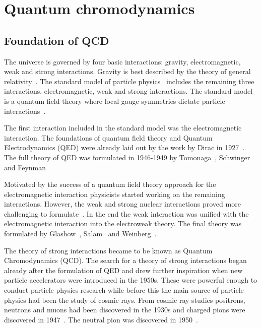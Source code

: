 \newpage
\section{Quantum chromodynamics}
\subsection{Foundation of QCD}
The universe is governed by four basic interactions: gravity, electromagnetic, weak and strong interactions. Gravity is best described by the theory of general relativity~\cite{Einstein1915}. The standard model of particle physics~\cite{Tanabashi:2018oca} includes the remaining three interactions, electromagnetic, weak and strong interactions.  The standard model is a quantum field theory where local gauge symmetries dictate  particle interactions~\cite{Perkins:1982xb}. 

The first interaction included in the standard model was the electromagnetic interaction. The foundations of quantum field theory and Quantum Electrodynamics (QED) were already laid out by the work by Dirac in 1927~\cite{doi:10.1098/rspa.1927.0039}. The full theory of QED was formulated in 1946-1949 by Tomonaga~\cite{Tomonaga:1946zz},  Schwinger~\cite{Schwinger:1948yj,Schwinger:1948yk} and Feynman~\cite{Feynman:1948fi}%

Motivated by the success of a quantum field theory approach for the electromagnetic interaction physicists started working on the remaining interactions. However, the weak and strong nuclear interactions proved more challenging to formulate~\cite{Krauss:2017}. In the end the weak interaction was unified with the electromagnetic interaction into the electroweak theory. The final theory was formulated by Glashow~\cite{Glashow:1970gm}, Salam~\cite{Salam:1964ry} and Weinberg~\cite{Weinberg:1967tq}.

The theory of strong interactions became to be known as Quantum Chromodynamics (QCD). The search for a theory of strong interactions began already after the formulation of QED and drew further inspiration when new particle accelerators were introduced in the 1950s. These were powerful enough to conduct particle physics research while before this the main source of particle physics had been the study of cosmic rays. From cosmic ray studies positrons, neutrons and muons had been discovered in the 1930s and charged pions were discovered in 1947~\cite{Occhialini:1987nr,Lattes:1947mx}. The neutral pion was discovered in 1950~\cite{Bjorklund:1950}.

